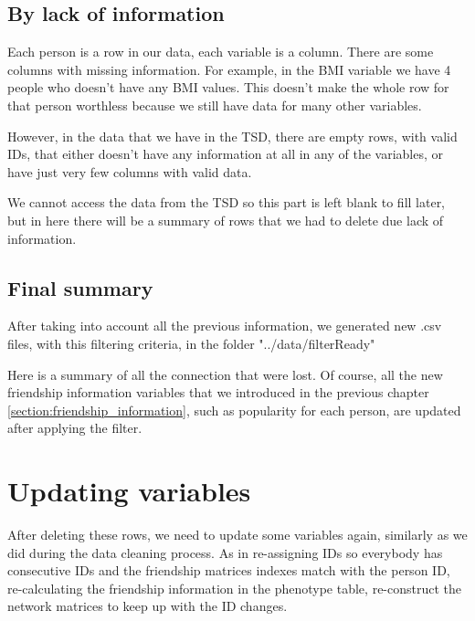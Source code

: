 \subsection{By lack of information}

Each person is a row in our data, each variable is a column. There are some columns with missing information. For example, in the BMI variable we have 4 people who doesn't have any BMI values. This doesn't make the whole row for that person worthless because we still have data for many other variables. \vspace{3 mm}

However, in the data that we have in the TSD, there are empty rows, with valid IDs, that either doesn't have any information at all in any of the variables, or have just very few columns with valid data.\vspace{3 mm}

We cannot access the data from the TSD so this part is left blank to fill later, but in here there will be a summary of rows that we had to delete due lack of information.\vspace{3 mm}

\subsection{Final summary}

After taking into account all the previous information, we generated new .csv files, with this filtering criteria, in the folder "../data/filterReady" \vspace{3 mm}

Here is a summary of all the connection that were lost. Of course, all the new friendship information variables that we introduced in the previous chapter \ref{section:friendship_information}, such as popularity for each person, are updated after applying the filter.\vspace{3 mm}







\section{Updating variables}

After deleting these rows, we need to update some variables again, similarly as we did during the data cleaning process. As in re-assigning IDs so everybody has consecutive IDs and the friendship matrices indexes match with the person ID, re-calculating the friendship information in the phenotype table, re-construct the network matrices to keep up with the ID changes.



\vspace{3 mm}